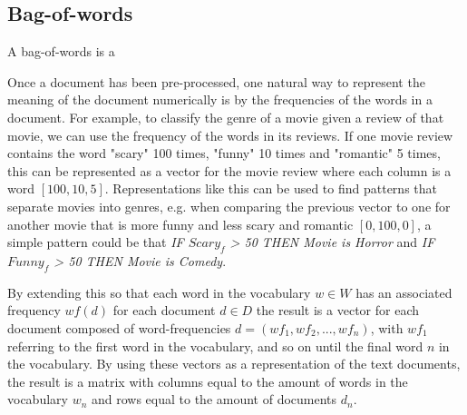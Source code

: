 

\subsection{Bag-of-words}\label{bg:BOW}

A bag-of-words is a

Once a document has been pre-processed, one natural way to represent the meaning of the document numerically is by  the frequencies of the words in a document. For example, to classify the genre of a movie given a review of that movie, we can use the frequency of the words in its reviews. If one movie review contains the word "scary" 100 times, "funny" 10 times and "romantic" 5 times, this can be represented as a vector for the movie review where each column is a word $[100, 10, 5]$. Representations like this can be used to find patterns that separate movies into genres, e.g. when comparing the previous vector to one for another movie that is more funny and less scary and romantic $[0, 100, 0]$, a simple pattern could be that \textit{IF $Scary_f$ > 50 THEN Movie is Horror} and \textit{IF $Funny_f$ > 50 THEN Movie is Comedy}.

By extending this  so that each word in the vocabulary $w \in W$ has an associated frequency ${wf}(d)$ for each document  $d \in D$  the result is a vector for each document composed of word-frequencies  $d = ({wf}_1, {wf}_2, ..., {wf}_n)$, with ${wf}_1$ referring to the first word in the vocabulary, and so on until the final word $n$ in the vocabulary. By using these vectors as a representation of the text documents, the result is a matrix  with columns equal to the amount of words in the vocabulary $w_n$ and rows equal to the amount of documents $d_n$. 

